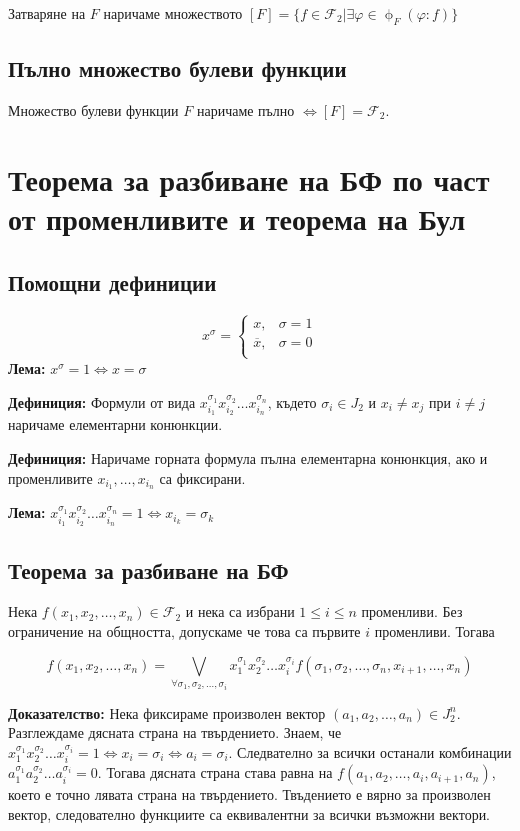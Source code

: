 \documentclass[fleqn,12pt]{article}
\begin{document}
\begin{flushleft}
Затваряне на $F$ наричаме множеството $[F] = \{ f \in \mathcal{F}_2 | \exists \varphi \in \upphi_F (\varphi : f) \}$

\subsection{Пълно множество булеви функции}
Множество булеви функции $F$ наричаме пълно $\Leftrightarrow [F] = \mathcal{F}_2$.

\section{Теорема за разбиване на БФ по част от променливите и теорема на Бул}

\subsection{Помощни дефиниции}
\[ x^\sigma = \begin{cases}
    x, & \sigma = 1 \\
    \overline{x}, & \sigma = 0 \\
\end{cases}\]
\textbf{Лема: } $x^\sigma = 1 \Leftrightarrow x = \sigma$

\textbf{Дефиниция: } Формули от вида $x_{i_1}^{\sigma_1} x_{i_2}^{\sigma_2} \dots x_{i_n}^{\sigma_n}$, където
$\sigma_i \in J_2$ и $x_i \neq x_j$ при $i \neq j$ наричаме елементарни конюнкции.
 
\textbf{Дефиниция: } Наричаме горната формула пълна елементарна конюнкция, ако и променливите $x_{i_1}, \dots, x_{i_n}$ са фиксирани.

\textbf{Лема: } $x_{i_1}^{\sigma_1} x_{i_2}^{\sigma_2} \dots x_{i_n}^{\sigma_n} = 1 \Leftrightarrow x_{i_k} = \sigma_k$

\subsection{Теорема за разбиване на БФ}
Нека $f(x_1, x_2, \dots, x_n) \in \mathcal{F}_2$ и нека са избрани $1 \leq i \leq n$ променливи.
Без ограничение на общността, допускаме че това са първите $i$ променливи. Тогава

\[ f(x_1, x_2, \dots, x_n) = \bigvee_{\forall \sigma_1, \sigma_2, \dots, \sigma_i} x_1^{\sigma_1} x_2^{\sigma_2} \dots x_i^{\sigma_i} f(\sigma_1, \sigma_2, \dots, \sigma_n, x_{i+1}, \dots, x_n) \]

\textbf{Доказателство: } Нека фиксираме произволен вектор $(a_1, a_2, \dots, a_n) \in J_2^n$.
Разглеждаме дясната страна на твърдението. Знаем, че 
$x_1^{\sigma_1} x_2^{\sigma_2} \dots x_i^{\sigma_i} = 1 \Leftrightarrow x_i = \sigma_i \Leftrightarrow a_i = \sigma_i$.
Следвателно за всички останали комбинации $a_1^{\sigma_1} a_2^{\sigma_2} \dots a_i^{\sigma_i} = 0$. Тогава дясната страна става равна на 
$f(a_1, a_2, \dots, a_i, a_{i+1}, a_n)$, което е точно лявата страна на твърдението. Твъдението е вярно за произволен вектор, следователно
функциите са еквивалентни за всички възможни вектори.


\end{flushleft}
\end{document}
